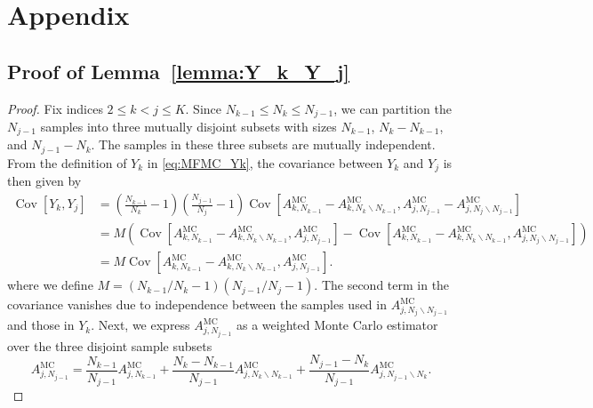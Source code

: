 
\section{Appendix}\label{sec:Appendix}
\subsection{Proof of Lemma~\ref{lemma:Y_k_Y_j} }   \label{sec:proof_lemma:Y_k_Y_j}


\begin{proof}
Fix indices $2\le k<j\le K$. Since $N_{k-1}\le N_k\le N_{j-1}$, we can partition the $N_{j-1}$ samples into three mutually disjoint subsets with sizes $N_{k-1}$, $N_{k}-N_{k-1}$, and $N_{j-1} - N_{k}$. The samples in these three subsets are mutually independent. From the definition of $Y_k$ in \eqref{eq:MFMC_Yk},  the covariance between $Y_k$ and $Y_j$ is then given by
\begin{align*}
    \operatorname{Cov}\left[Y_k,Y_j\right] &= \left(\frac{N_{k-1}}{N_k}-1\right) \left(\frac{N_{j-1}}{N_j}-1\right)\operatorname{Cov}\left[A_{k, N_{k-1}}^{\text{MC}} - A_{k,N_{k}\backslash N_{k-1}}^{\text{MC}}, A_{j,N_{j-1}}^{\text{MC}} - A_{j,N_{j}\backslash N_{j-1}}^{\text{MC}}\right]\\
    & = M \left(\operatorname{Cov}\left[A_{k,N_{k-1}}^{\text{MC}} - A_{k,N_{k}\backslash N_{k-1}}^{\text{MC}}, A_{j,N_{j-1}}^{\text{MC}}\right] - \operatorname{Cov}\left[A_{k,N_{k-1}}^{\text{MC}} - A_{k,N_{k}\backslash N_{k-1}}^{\text{MC}}, A_{j,N_{j}\backslash N_{j-1}}^{\text{MC}}\right] \right)\\
    & = M \operatorname{Cov}\left[A_{k,N_{k-1}}^{\text{MC}} - A_{k,N_{k}\backslash N_{k-1}}^{\text{MC}}, A_{j,N_{j-1}}^{\text{MC}}\right].
\end{align*}
where we define $M = (N_{k-1}/N_k-1) (N_{j-1}/N_j-1)$. The second term in the covariance vanishes due to independence between the samples used in $A_{j,N_{j}\backslash N_{j-1}}^{\text{MC}}$ and those in $Y_k$. Next, we express $A_{j,N_{j-1}}^{\text{MC}}$ as a weighted Monte Carlo estimator over the three disjoint sample subsets
%
\begin{equation*}
    A_{j,N_{j-1}}^{\text{MC}} = \frac{N_{k-1}}{N_{j-1}}A_{j,N_{k-1}}^{\text{MC}} + \frac{N_k - N_{k-1}}{N_{j-1}} A_{j,N_{k}\backslash N_{k-1}}^{\text{MC}} + \frac{N_{j-1} - N_k}{N_{j-1}} A_{j,N_{j-1}\backslash N_{k}}^{\text{MC}}.

\end{equation*}
\end{proof}
